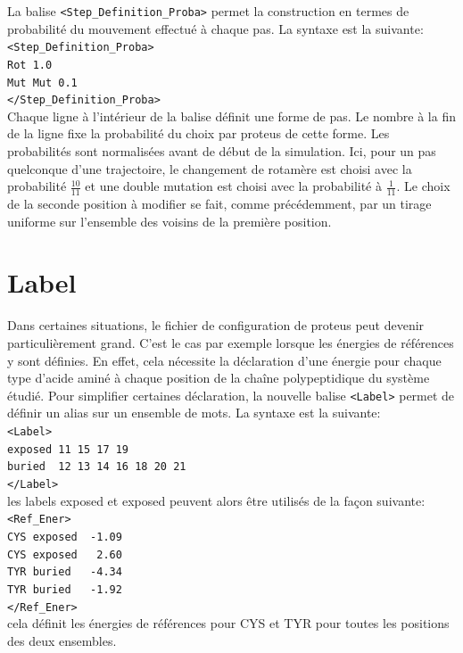 La balise \verb!<Step_Definition_Proba>! permet la construction en termes de probabilité du mouvement effectué à chaque pas. La syntaxe est la suivante:\\
\verb!<Step_Definition_Proba>! \\
\verb!Rot 1.0! \\
\verb!Mut Mut 0.1! \\
\verb!</Step_Definition_Proba>! \\
Chaque ligne à l'intérieur de la balise définit une forme de pas. Le nombre à la fin de la ligne fixe la probabilité du choix par proteus de cette forme. Les probabilités sont normalisées avant de début de la simulation. Ici, pour un pas quelconque d'une trajectoire, le changement de rotamère est choisi avec la probabilité $\frac{10}{11}$ et une double mutation est choisi avec la probabilité à $\frac{1}{11}$. Le choix de la seconde position à modifier se fait, comme précédemment, par un tirage uniforme sur l'ensemble des voisins de la première position.


\section{Label}
Dans certaines situations, le fichier de configuration de proteus peut devenir particulièrement grand. C'est le cas par exemple lorsque les énergies de références y sont définies. En effet, cela nécessite la déclaration d'une énergie pour chaque type d'acide aminé à chaque position de la chaîne polypeptidique du système étudié. Pour simplifier certaines déclaration, la nouvelle balise \verb!<Label>! permet de définir un alias sur un ensemble de mots. La syntaxe est la suivante:\\
\verb!<Label>! \\
\verb!exposed 11 15 17 19 ! \\
\verb!buried  12 13 14 16 18 20 21 ! \\
\verb!</Label>! \\
les labels \og exposed \fg et \og exposed \fg peuvent alors être utilisés de la façon suivante:\\
\verb!<Ref_Ener>! \\
\verb!CYS exposed  -1.09 ! \\
\verb!CYS exposed   2.60! \\
\verb!TYR buried   -4.34! \\
\verb!TYR buried   -1.92! \\
\verb!</Ref_Ener>! \\
cela définit les énergies de références pour CYS et TYR pour toutes les positions des deux ensembles.


